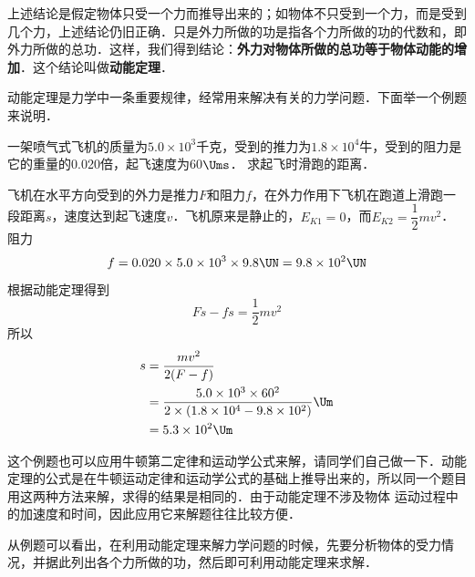 上述结论是假定物体只受一个力而推导出来的；如物体不只受到一个力，而是受到几个力，上述结论仍旧正确．只是外力所做的功是指各个力所做的功的代数和，即外力所做的总功．这样，我们得到结论：\textbf{外力对物体所做的总功等于物体动能的增加}．这个结论叫做\textbf{动能定理}．

动能定理是力学中一条重要规律，经常用来解决有关的力学问题．下面举一个例题来说明．


\begin{example}
    一架喷气式飞机的质量为$5.0\times 10^3$千克，受到的推力为$1.8\times 10^4$牛，受到的阻力是它的重量的0.020倍，起飞速度为60$\Ums$．
    求起飞时滑跑的距离．
\end{example}


\begin{solution}
    飞机在水平方向受到的外力是推力$F$和阻力$f$，在外力作用下飞机在跑道上滑跑一段距离$s$，速度达到起飞速度$v$．飞机原来是静止的，$E_{K1}=0$，而$E_{K2}=\dfrac{1}{2}mv^2$．阻力
    $$f=0.020\times 5.0\times 10^{3}\times 9.8 \UN =9.8\times 10^2 \UN $$
    根据动能定理得到
	\[Fs-fs=\frac{1}{2}mv^2 \]
    所以
    \[\begin{split}
        s&=\frac{mv^2}{2(F-f)}\\
&=\frac{5.0\times 10^{3}\times 60^2}{2\times (1.8\times 10^{4}-9.8\times 10^2)} \Um \\
&=5.3\times 10^{2} \Um
    \end{split}\]
	\end{solution}

    这个例题也可以应用牛顿第二定律和运动学公式来解，请同学们自己做一下．动能定理的公式是在牛顿运动定律和运动学公式的基础上推导出来的，所以同一个题目用这两种方法来解，求得的结果是相同的．由于动能定理不涉及物体
    运动过程中的加速度和时间，因此应用它来解题往往比较方便．

    从例题可以看出，在利用动能定理来解力学问题的时候，先要分析物体的受力情况，并据此列出各个力所做的功，然后即可利用动能定理来求解．
    
